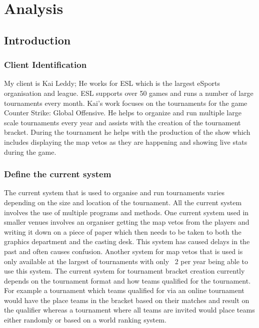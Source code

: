 \chapter{Analysis}

\section{Introduction}
 
\subsection{Client Identification}
My client is Kai Leddy; He works for ESL which is the largest eSports organisation and league. ESL supports over 50 games and runs a number of large tournaments every month. Kai's work focuses on the tournaments for the game Counter Strike: Global Offensive. He helps to organize and run multiple large scale tournaments every year and assists with the creation of the tournament bracket. During the tournament he helps with the production of the show which includes displaying the map vetos as they are happening and showing live stats during the game.

\subsection{Define the current system}
The current system that is used to organise and run tournaments varies depending on the size and location of the tournament. All the current system involves the use of multiple programs and methods. One current system used in smaller venues involves an organiser getting the map vetos from the players and writing it down on a piece of paper which then needs to be taken to both the graphics department and the casting desk. This system has caused delays in the past and often causes confusion. Another system for map vetos that is used is only available at the largest of tournaments with only ~2 per year being able to use this system.
The current system for tournament bracket creation currently depends on the tournament format and how teams qualified for the tournament. For example a tournament which teams qualified for via an online tournament would have the place teams in the bracket based on their matches and result on the qualifier whereas a tournament where all teams are invited would place teams either randomly or based on a world ranking system.

